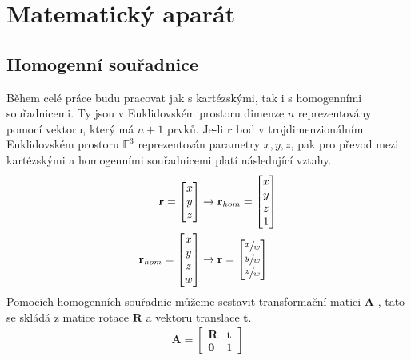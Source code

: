 \documentclass[twoside]{ctuthesis}
\newcommand{\tl}[1]{$\mathbf{#1}$}
\begin{document}
\maketitle

\chapter{Matematický aparát}
\section{Homogenní souřadnice}
Během celé práce budu pracovat jak s kartézskými, tak i s homogenními souřadnicemi. Ty jsou v Euklidovském prostoru dimenze $n$ reprezentovány pomocí vektoru, který má $n+1$ prvků. Je-li $\boldsymbol{r}$ bod v trojdimenzionálním Euklidovském prostoru $\mathbb{E}^3$ reprezentován parametry $x,y,z$, pak pro převod mezi kartézskými a homogenními souřadnicemi platí následující vztahy.
\begin{align}
    \mathbf{r} = \begin{bmatrix} x \\ y \\ z \end{bmatrix} &\rightarrow \mathbf{r}_{hom} = \begin{bmatrix} x \\ y \\ z \\ 1 \end{bmatrix} \\
    \mathbf{r}_{hom} = \begin{bmatrix} x \\ y \\ z \\ w \end{bmatrix} &\rightarrow \mathbf{r} = \begin{bmatrix} \sfrac{x}{w} \\ \sfrac{y}{w} \\ \sfrac{z}{w} \end{bmatrix}
\end{align}
Pomocích homogenních souřadnic můžeme sestavit transformační matici \tl{A} , tato se skládá z matice rotace \tl{R} a vektoru translace \tl{t}.
\begin{align}
    \mathbf{A} = \begin{bmatrix} \mathbf{R} & \mathbf{t} \\ \mathbf{0} & 1 \end{bmatrix}
\end{align}
\end{document}
